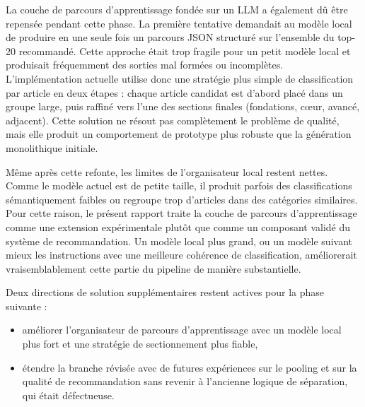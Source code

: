 La couche de parcours d'apprentissage fondée sur un LLM a également dû être
repensée pendant cette phase. La première tentative demandait au modèle local
de produire en une seule fois un parcours JSON structuré sur l'ensemble du
top-20 recommandé. Cette approche était trop fragile pour un petit modèle
local et produisait fréquemment des sorties mal formées ou incomplètes.
L'implémentation actuelle utilise donc une stratégie plus simple de
classification par article en deux étapes : chaque article candidat est
d'abord placé dans un groupe large, puis raffiné vers l'une des sections
finales (fondations, cœur, avancé, adjacent). Cette solution ne résout pas
complètement le problème de qualité, mais elle produit un comportement de
prototype plus robuste que la génération monolithique initiale.

Même après cette refonte, les limites de l'organisateur local restent nettes.
Comme le modèle actuel est de petite taille, il produit parfois des
classifications sémantiquement faibles ou regroupe trop d'articles dans des
catégories similaires. Pour cette raison, le présent rapport traite la couche
de parcours d'apprentissage comme une extension expérimentale plutôt que comme
un composant validé du système de recommandation. Un modèle local plus grand,
ou un modèle suivant mieux les instructions avec une meilleure cohérence de
classification, améliorerait vraisemblablement cette partie du pipeline de
manière substantielle.

Deux directions de solution supplémentaires restent actives pour la phase
suivante :
\begin{itemize}
    \item améliorer l'organisateur de parcours d'apprentissage avec un modèle
    local plus fort et une stratégie de sectionnement plus fiable,
    \item étendre la branche révisée avec de futures expériences sur le pooling
    et sur la qualité de recommandation sans revenir à l'ancienne logique de
    séparation, qui était défectueuse.
\end{itemize}
